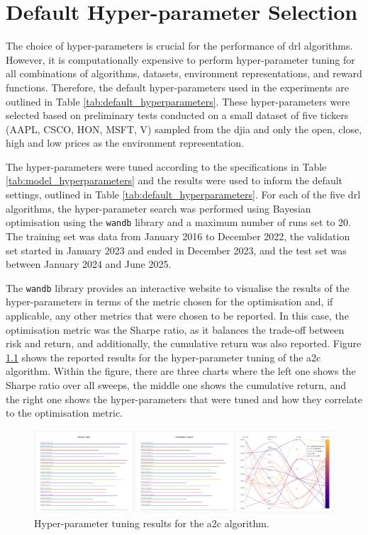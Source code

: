 \chapter{Default Hyper-parameter Selection} \label{app:experiment_hyperparameters}

The choice of hyper-parameters is crucial for the performance of \acrshort{drl} algorithms. However, it is computationally expensive to perform hyper-parameter tuning for all combinations of algorithms, datasets, environment representations, and reward functions. Therefore, the default hyper-parameters used in the experiments are outlined in Table \ref{tab:default_hyperparameters}. These hyper-parameters were selected based on preliminary tests conducted on a small dataset of five tickers (AAPL, CSCO, HON, MSFT, V) sampled from the \acrshort{djia} and only the open, close, high and low prices as the environment representation.

The hyper-parameters were tuned according to the specifications in Table \ref{tab:model_hyperparameters} and the results were used to inform the default settings, outlined in Table \ref{tab:default_hyperparameters}. For each of the five \acrshort{drl} algorithms, the hyper-parameter search was performed using Bayesian optimisation using the \texttt{wandb} library and a maximum number of runs set to 20. The training set was data from January 2016 to December 2022, the validation set started in January 2023 and ended in December 2023, and the test set was between January 2024 and June 2025.

The \texttt{wandb} library provides an interactive website to visualise the results of the hyper-parameters in terms of the metric chosen for the optimisation and, if applicable, any other metrics that were chosen to be reported. In this case, the optimisation metric was the Sharpe ratio, as it balances the trade-off between risk and return, and additionally, the cumulative return was also reported. Figure \ref{fig:a2c_hyperparameter_tuning} shows the reported results for the hyper-parameter tuning of the \acrshort{a2c} algorithm. Within the figure, there are three charts where the left one shows the Sharpe ratio over all sweeps, the middle one shows the cumulative return, and the right one shows the hyper-parameters that were tuned and how they correlate to the optimisation metric.

\begin{figure}[h]
\centering
\includegraphics[width=\textwidth]{figures/a2c_hyperparameter_tuning.png}
\caption{Hyper-parameter tuning results for the \acrshort{a2c} algorithm. }
\label{fig:a2c_hyperparameter_tuning}
\end{figure}

